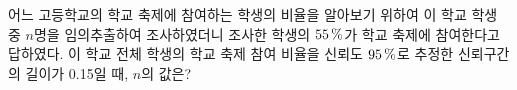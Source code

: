 어느 고등학교의 학교 축제에 참여하는 학생의 비율을 알아보기 위하여 이 학교 학생 중 $n$명을 임의추출하여 조사하였더니 조사한 학생의 $55\mkern3mu \%$가 학교 축제에 참여한다고 답하였다. 이 학교 전체 학생의 학교 축제 참여 비율을 신뢰도 $95\mkern3mu \%$로 추정한 신뢰구간의 길이가 0.15일 때, $n$의 값은? 
